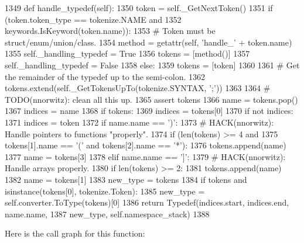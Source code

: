 \begin{DoxyCode}
1349     \textcolor{keyword}{def }handle\_typedef(self):
1350         token = self.\_GetNextToken()
1351         \textcolor{keywordflow}{if} (token.token\_type == tokenize.NAME \textcolor{keywordflow}{and}
1352             keywords.IsKeyword(token.name)):
1353             \textcolor{comment}{# Token must be struct/enum/union/class.}
1354             method = getattr(self, \textcolor{stringliteral}{'handle\_'} + token.name)
1355             self.\_handling\_typedef = \textcolor{keyword}{True}
1356             tokens = [method()]
1357             self.\_handling\_typedef = \textcolor{keyword}{False}
1358         \textcolor{keywordflow}{else}:
1359             tokens = [token]
1360 
1361         \textcolor{comment}{# Get the remainder of the typedef up to the semi-colon.}
1362         tokens.extend(self.\_GetTokensUpTo(tokenize.SYNTAX, \textcolor{stringliteral}{';'}))
1363 
1364         \textcolor{comment}{# TODO(nnorwitz): clean all this up.}
1365         \textcolor{keyword}{assert} tokens
1366         name = tokens.pop()
1367         indices = name
1368         \textcolor{keywordflow}{if} tokens:
1369             indices = tokens[0]
1370         \textcolor{keywordflow}{if} \textcolor{keywordflow}{not} indices:
1371             indices = token
1372         \textcolor{keywordflow}{if} name.name == \textcolor{stringliteral}{')'}:
1373             \textcolor{comment}{# HACK(nnorwitz): Handle pointers to functions "properly".}
1374             \textcolor{keywordflow}{if} (len(tokens) >= 4 \textcolor{keywordflow}{and}
1375                 tokens[1].name == \textcolor{stringliteral}{'('} \textcolor{keywordflow}{and} tokens[2].name == \textcolor{stringliteral}{'*'}):
1376                 tokens.append(name)
1377                 name = tokens[3]
1378         \textcolor{keywordflow}{elif} name.name == \textcolor{stringliteral}{']'}:
1379             \textcolor{comment}{# HACK(nnorwitz): Handle arrays properly.}
1380             \textcolor{keywordflow}{if} len(tokens) >= 2:
1381                 tokens.append(name)
1382                 name = tokens[1]
1383         new\_type = tokens
1384         \textcolor{keywordflow}{if} tokens \textcolor{keywordflow}{and} isinstance(tokens[0], tokenize.Token):
1385             new\_type = self.converter.ToType(tokens)[0]
1386         \textcolor{keywordflow}{return} Typedef(indices.start, indices.end, name.name,
1387                        new\_type, self.namespace\_stack)
1388 
\end{DoxyCode}
Here is the call graph for this function\+:
